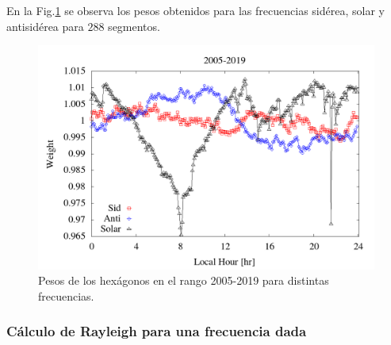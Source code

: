       En la Fig.\ref{fig:pesos_ejemplo} se observa los pesos obtenidos para las frecuencias sidérea, solar y antisidérea para $288$ segmentos.

        \begin{figure}[H]
          \centering
              \includegraphics[width=0.85\linewidth]{../report_2_27_04_2020/Graficos/weigth2005-2019.png}
              \caption{Pesos de los hexágonos en el rango 2005-2019 para distintas frecuencias.}
              \label{fig:pesos_ejemplo}
        \end{figure}

  \subsubsection{Cálculo de Rayleigh para una frecuencia dada}

